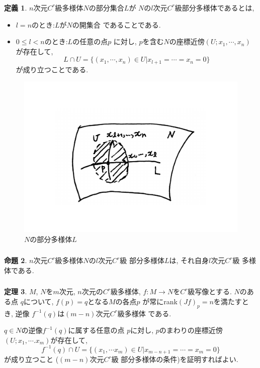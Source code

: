 \documentclass[dvipdfmx,cjk]{beamer}
\theoremstyle{definition}
\newtheorem{dfn}{\textbf{ 定義 }}
\newtheorem{thm}[dfn]{\textbf{ 定理 }}
\newtheorem{prop}[dfn]{\textbf{ 命題 }}
\begin{document}
\begin{frame}
  \frametitle{}
  \begin{dfn}\label{def:C^r-submanifold}
    $n$次元$C^r$級多様体$N$の部分集合$L$が
    $N$の$l$次元$C^r$級部分多様体であるとは, 
    \begin{itemize}
        \item[(1)]$l=n$のとき:$L$が$N$の開集合
        であることである. 
        \item[(2)] $0\leq l<n$のとき:$L$の任意の点$p$
        に対し, $p$を含む$N$の座標近傍$(U;x_1,\cdots ,x_n)$
        が存在して, 
        $$L\cap U=\{(x_1,\cdots ,x_n)\in U|
        x_{l+1}=\cdots =x_n=0\}$$
        が成り立つことである. 
    \end{itemize}
  \end{dfn}
  \begin{figure}[H]
    \centering
    \includegraphics[keepaspectratio, scale=0.2]{CrSubmanifold.pdf}
    \caption{$N$の部分多様体$L$}
    \label{CrSubmanifold}
   \end{figure}
\end{frame}

\begin{frame}
  \frametitle{}
  \begin{prop}\label{prop:dim of C^r-submanifold}
    $n$次元$C^r$級多様体$N$の$l$次元$C^r$級
    部分多様体$L$は, それ自身$l$次元$C^r$級
    多様体である. 
  \end{prop}
\end{frame}
     
\begin{frame}
  \frametitle{}
  \begin{thm}\label{theo:f^{-1}(q) C^r manifold}
    $M$, $N$を$m$次元, $n$次元の$C^r$級多様体, 
    $f:M\to N$を$C^r$級写像とする. $N$のある点
    $q$について, $f(p)=q$となる$M$の各点$p$
    が常にrank$(Jf)_p=n$を満たすとき, 逆像
    $f^{-1}(q)$は$(m-n)$次元$C^r$級多様体
    である. 
  \end{thm}
  $q\in N$の逆像$f^{-1}(q)$に属する任意の点
  $p$に対し, $p$のまわりの座標近傍
  $(U;x_1,\cdots .x_m)$が存在して, 
  $$f^{-1}(q)\cap U
  =\{(x_1,\cdots x_m)\in U|
  x_{m-n+1}=\cdots =x_m=0\}$$
  が成り立つこと
  ($(m-n)$次元$C^r$級
  部分多様体の条件)を証明すればよい. 
\end{frame}
\end{document}
